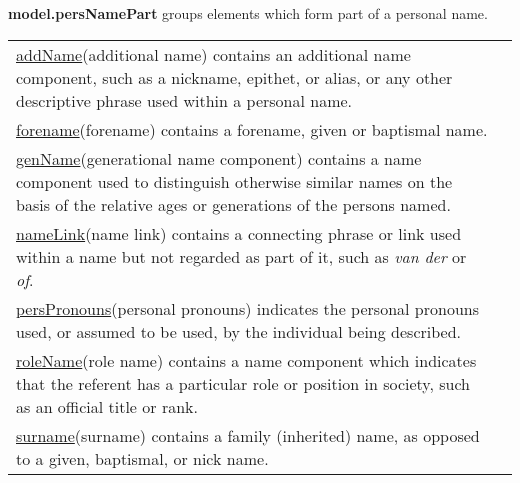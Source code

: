 \begin{sansreflist}
\item [\textbf{model.persNamePart}] groups elements which form part of a personal name. \par 
\begin{longtable}{P{0.17762331838565024\textwidth}P{0.6723766816143498\textwidth}}
\hyperref[TEI.addName]{addName}\tabcellsep (additional name) contains an additional name component, such as a nickname, epithet, or alias, or any other descriptive phrase used within a personal name.\\
\hyperref[TEI.forename]{forename}\tabcellsep (forename) contains a forename, given or baptismal name.\\
\hyperref[TEI.genName]{genName}\tabcellsep (generational name component) contains a name component used to distinguish otherwise similar names on the basis of the relative ages or generations of the persons named.\\
\hyperref[TEI.nameLink]{nameLink}\tabcellsep (name link) contains a connecting phrase or link used within a name but not regarded as part of it, such as \textit{van der} or \textit{of}.\\
\hyperref[TEI.persPronouns]{persPronouns}\tabcellsep (personal pronouns) indicates the personal pronouns used, or assumed to be used, by the individual being described.\\
\hyperref[TEI.roleName]{roleName}\tabcellsep (role name) contains a name component which indicates that the referent has a particular role or position in society, such as an official title or rank.\\
\hyperref[TEI.surname]{surname}\tabcellsep (surname) contains a family (inherited) name, as opposed to a given, baptismal, or nick name.\end{longtable} \par
 

\end{sansreflist}

